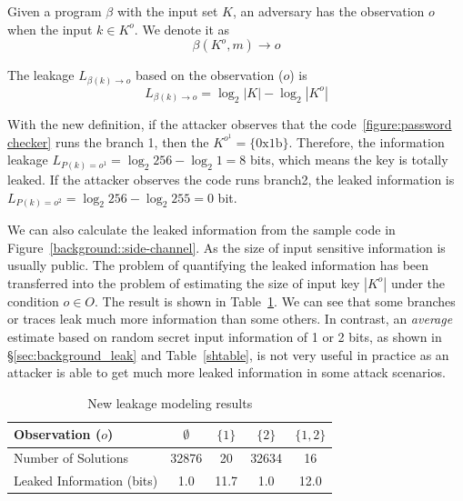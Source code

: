 \begin{mydef}
    \label{def}
    Given a program $\beta$ with the input set $K$,
    an adversary has the observation $o$ when the input $k{\in}K^o$.
    We denote it as
    $$\beta(K^o, m) \rightarrow	o$$

    The leakage $L_{\beta(k)\rightarrow o}$ based on the observation ($o$) is
    $$L_{\beta(k)\rightarrow o} = \log_2{|K|} - \log_2{|K^o|}$$
\end{mydef}

With the new definition, if the attacker observes that the
code~\ref{figure:password checker} runs the branch 1, then the $K^{o^{1}} =
\{\mathrm{0x1b}\}$. Therefore, the information leakage $L_{P(k)=o^{1}} =
\log_2{256} - \log_2{1} = 8$ bits, which means the key is totally leaked. If the
attacker observes the code runs branch2, the leaked information is
$L_{P(k)=o^{2}} = \log_2{256} - \log_2{255} = 0$ bit.


We can also calculate the leaked information from the sample code in
Figure~\ref{background::side-channel}. As the size of input sensitive
information is usually public. The problem of quantifying the leaked information
has been transferred into the problem of estimating the size of input key
$|K^o|$ under the condition $o \in O$. The result is shown in
Table~\ref{shtable2}. We can see that some branches or traces leak much more
information than some others. In contrast, an \emph{average} estimate based on
random secret input information of 1 or 2 bits, as shown in
\S\ref{sec:background_leak} and Table~\ref{shtable}, is not very useful in
practice as an attacker is able to get much more leaked information in some
attack scenarios.

\begin{table}[ht]
    \centering
    \caption{New leakage modeling results}
    \label{shtable2}
    \begin{tabular}{l|cccc}
        \hline
        Observation ($o$)         & $\emptyset$ & ${\{1\}}$ & ${\{2\}}$ & ${\{1, 2\}}$ \\ \hline
        Number of Solutions       & 32876       & 20        & 32634     & 16           \\ \hline
        Leaked Information (bits) & 1.0         & 11.7      & 1.0       & 12.0         \\
        \hline
    \end{tabular}
\end{table}

